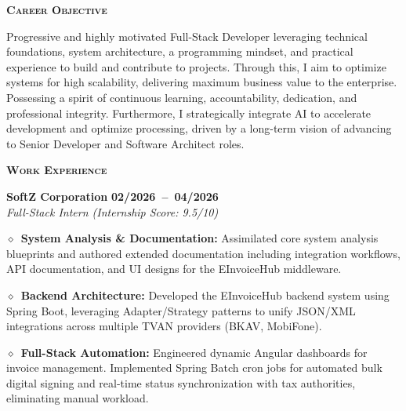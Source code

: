 \documentclass[11pt, a4paper]{article}
\newcommand{\dates}[1]{\hfill\mbox{\textbf{#1}}}
\newcommand{\is}{\par\vspace*{0.1ex}}
\newcommand{\smaller}[1]{{\small$\diamond$\ #1}}
\newcommand{\headright}[1]{\vspace*{0.4ex}\textsc{\Large\color{cvblue}\textbf{#1}}\par%
     \vspace*{-1.2ex}{\color{cvblue}\hrulefill}\par\vspace*{0.2ex}}
\begin{document}
\begin{minipage}[t]{0.59\textwidth}
\vspace{0pt} 
\raggedright
\setlength{\parskip}{0pt}
\vspace*{3mm}

\headright{Career Objective}
\is
\small
Progressive and highly motivated Full-Stack Developer leveraging technical foundations, system architecture, a programming mindset, and practical experience to build and contribute to projects. Through this, I aim to optimize systems for high scalability, delivering maximum business value to the enterprise. Possessing a spirit of continuous learning, accountability, dedication, and professional integrity. Furthermore, I strategically integrate AI to accelerate development and optimize processing, driven by a long-term vision of advancing to Senior Developer and Software Architect roles.

\headright{Work Experience}
\is
\textbf{SoftZ Corporation} \hfill \dates{02/2026 -- 04/2026} \\
\textit{Full-Stack Intern (Internship Score: 9.5/10)}
\is
\smaller{\textbf{System Analysis \& Documentation:} Assimilated core system analysis blueprints and authored extended documentation including integration workflows, API documentation, and UI designs for the EInvoiceHub middleware.}
\is
\smaller{\textbf{Backend Architecture:} Developed the EInvoiceHub backend system using Spring Boot, leveraging Adapter/Strategy patterns to unify JSON/XML integrations across multiple TVAN providers (BKAV, MobiFone).}
\is
\smaller{\textbf{Full-Stack Automation:} Engineered dynamic Angular dashboards for invoice management. Implemented Spring Batch cron jobs for automated bulk digital signing and real-time status synchronization with tax authorities, eliminating manual workload.}


\end{minipage}
\end{document}
